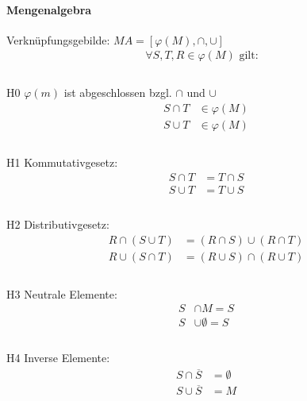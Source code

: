 \documentclass[a4paper]{scrartcl}
\begin{document}
				 \paragraph{Mengenalgebra}	
				 
				 Verknüpfungsgebilde: \(MA = [ \varphi (M), \cap , \cup ]\)
				 \begin{align*}
				 	\forall S, T, R \in \varphi(M) \text{ gilt:}&\\
				 	\\
				 \end{align*}
				 	
				 	H0 \( \varphi (m)\) ist abgeschlossen bzgl. \( \cap \) und \( \cup \)
				\begin{align*}
				 	S \cap T &\in \varphi (M) \\
				 	S \cup T &\in \varphi (M)\\
				 	\\
				\end{align*}
				 	
				 	H1 Kommutativgesetz:
			 	\begin{align*}
				 	S \cap T  &= T \cap S \\
				 	S \cup T &= T \cup S \\
				 	\\
				\end{align*}
				 	
				 	H2 Distributivgesetz:
			 	\begin{align*}
				 	R \cap (S \cup T)& = ( R \cap S) \cup ( R \cap T)\\
				 	R \cup (S \cap T) &= ( R \cup S) \cap ( R \cup T)\\
				 	\\
				\end{align*}
				 	
				 H3 Neutrale Elemente:
			 	\begin{align*}
				 	S &\cap M = S\\
				 	S &\cup \emptyset = S\\
				 	\\
			   	\end{align*}
			   	
				   	H4 Inverse Elemente:
			  	\begin{align*}
				 	S \cap \overline{S} &= \emptyset \\
				 	S \cup \overline{S} &= M \\
				 \end{align*}
				 
\end{document}
